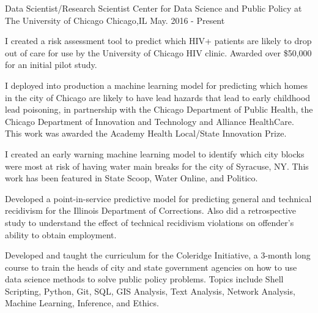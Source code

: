 

\begin{cventries}


  \cventry
    {Data Scientist/Research Scientist} %
    {Center for Data Science and Public Policy at The University of Chicago} %
    {Chicago,IL} %
    {May. 2016 - Present} %
    {\begin{cvitems}
        \setlength\itemsep{.5em}
        \item {I created a risk assessment tool to predict which HIV+ patients are likely to drop out of care for use by the University of Chicago HIV clinic. Awarded over \$50,000 for an initial pilot study.}
        \item {I deployed into production a machine learning model for predicting which homes in the city of Chicago are likely to have lead hazards that lead to early childhood lead poisoning, in partnership with the Chicago Department of Public Health, the Chicago Department of Innovation and Technology and Alliance HealthCare. This work was awarded the Academy Health Local/State Innovation Prize.}
         \item {I created an early warning machine learning model to identify which city blocks were most at risk of having water main breaks for the city of Syracuse, NY. This work has been featured in State Scoop, Water Online, and Politico.}
         \item {Developed a point-in-service predictive model for predicting general and technical recidivism for the Illinois Department of Corrections. Also did a retrospective study to understand the effect of technical recidivism violations on offender's ability to obtain employment.}
         \item{Developed and taught the curriculum for the Coleridge Initiative, a 3-month long course to train the heads of city and state government agencies on how to use data science methods to solve public policy problems. Topics include Shell Scripting, Python, Git, SQL, GIS Analysis, Text Analysis, Network Analysis, Machine Learning, Inference, and Ethics.}
     \end{cvitems}}



\end{cventries}
